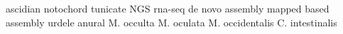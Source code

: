 ascidian
notochord
tunicate
NGS
rna-seq
de novo assembly
mapped based assembly
urdele
anural
M. occulta
M. oculata
M. occidentalis
C. intestinalis
